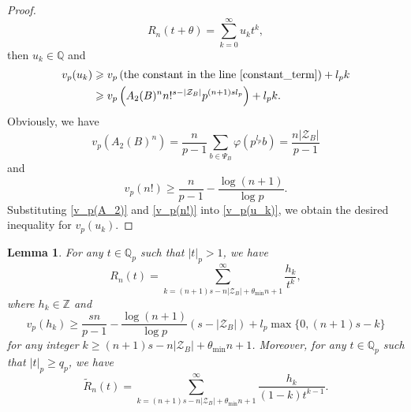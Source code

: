 \documentclass[12pt]{article}
\newtheorem{lemma}[theorem]{Lemma}
\numberwithin{equation}{section}
\begin{document}
\begin{proof}
\[ R_n(t+\theta) = \sum_{k=0}^{\infty} u_k t^{k}, \]
then $u_k \in \mathbb{Q}$ and 
\begin{align}
	v_p(u_k) &\geqslant v_p\left( \text{the constant in the line \eqref{constant_term}} \right) + l_pk \notag\\
	&\geqslant v_p\left( A_2(B)^{n} n!^{s-|\mathcal{Z}_B|} p^{(n+1)sl_p} \right) + l_pk. \label{v_p(u_k)}
\end{align}
Obviously, we have
\begin{equation}\label{v_p(A_2)}
	v_p(A_2(B)^n) = \frac{n}{p-1} \sum_{b \in \Psi_B} \varphi(p^{l_p}b) = \frac{n|\mathcal{Z}_B|}{p-1} 
\end{equation}
and
\begin{equation}\label{v_p(n!)}
	v_p(n!) \geqslant \frac{n}{p-1} - \frac{\log(n+1)}{\log p}.
\end{equation}
Substituting \eqref{v_p(A_2)} and \eqref{v_p(n!)} into \eqref{v_p(u_k)}, we obtain the desired inequality for $v_p(u_k)$.
\end{proof}

	
\begin{lemma}\label{lemma_h_k}
	For any $t \in \mathbb{Q}_p$ such that $|t|_p > 1$, we have
	\[ R_n(t) = \sum_{k=(n+1)s-n|\mathcal{Z}_B|+\theta_{\min}n+1}^{\infty} \frac{h_k}{t^k}, \]
	where $h_k \in \mathbb{Z}$ and
	\[ v_p(h_k) \geqslant \frac{sn}{p-1}-\frac{\log(n+1)}{\log p}(s-|\mathcal{Z}_B|) + l_p\max\{0,(n+1)s-k\} \]
	for any integer $k \geqslant (n+1)s-n|\mathcal{Z}_B|+\theta_{\min}n+1$. Moreover, for any $t \in \mathbb{Q}_p$ such that $|t|_p \geqslant q_p$, we have
	\[ \widetilde{R}_n(t) = \sum_{k=(n+1)s-n|\mathcal{Z}_B|+\theta_{\min}n+1}^{\infty} \frac{h_{k}}{(1-k)t^{k-1}}. \]
\end{lemma}
\end{document}
